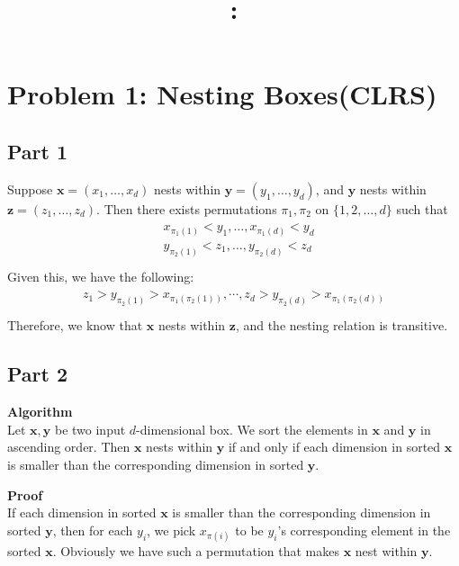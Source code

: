 \documentclass{article}
\title{\textmd{\bf \Class: \Title}}
\date{}
\author{\textbf{\StudentName}}
\newcommand{\Proof}{\vspace{0.3cm} \noindent\textbf{Proof} \\}
\newcommand{\Algorithm}{\textbf{Algorithm} \\}
\begin{document}
\maketitle \thispagestyle{empty}
\section*{Problem 1: Nesting Boxes(CLRS)}
\subsection*{Part 1}
Suppose $\mathbf{x} = (x_1,\dots,x_d)$ nests within $\mathbf{y}=(y_1,\dots,y_d)$, and $\mathbf{y}$ nests
within $\mathbf{z} = (z_1, \dots, z_d)$. Then there exists permutations $\pi_1, \pi_2$ on
$\{1,2,\dots,d\}$ such that
\begin{align}
  \begin{split}
    & x_{\pi_1(1)} < y_1, \dots, x_{\pi_1(d)} < y_d \\
    & y_{\pi_2(1)} < z_1, \dots, y_{\pi_2(d)} < z_d \\
  \end{split}
\end{align}
Given this, we have the following:
\begin{align}
  \begin{split}
    z_1 > y_{\pi_2(1)} > x_{\pi_1(\pi_2(1))}, \cdots, 
    z_d > y_{\pi_2(d)} > x_{\pi_1(\pi_2(d))} \\
  \end{split}
\end{align}
Therefore, we know that $\mathbf{x}$ nests within $\mathbf{z}$, and the nesting relation is
transitive. 

\subsection*{Part 2}
\Algorithm
Let $\mathbf{x}, \mathbf{y}$ be two input $d$-dimensional box. We sort the elements in 
$\mathbf{x}$ and $\mathbf{y}$ in ascending order. Then $\mathbf{x}$ nests within $\mathbf{y}$ if and
only if each dimension in sorted $\mathbf{x}$ is smaller than the corresponding dimension in sorted 
$\mathbf{y}$.

\Proof
If each dimension in sorted $\mathbf{x}$ is smaller than the corresponding dimension in sorted
$\mathbf{y}$, then for each $y_i$, we pick $x_{\pi(i)}$ to be $y_i$'s corresponding element in the
sorted $\mathbf{x}$. Obviously we have such a permutation that makes $\mathbf{x}$ nest within
$\mathbf{y}$.
\end{document}

